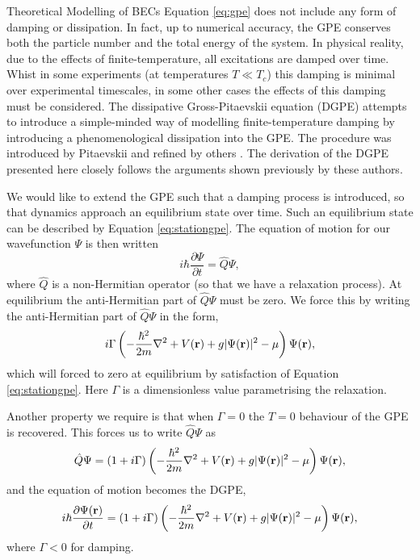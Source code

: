 \begin{chapter}{\label{cha:theoretical_model}Theoretical Modelling of BECs}
	Equation \ref{eq:gpe} does not include any form of damping or dissipation. In fact, up to numerical accuracy, the GPE conserves both the particle number and the total energy of the system. In physical reality, due to the effects of finite-temperature, all excitations are damped over time. Whist in some experiments (at temperatures $T\ll T_c$) this damping is minimal over experimental timescales, in some other cases the effects of this damping must be considered. The dissipative Gross-Pitaevskii equation (DGPE) attempts to introduce a simple-minded way of modelling finite-temperature damping by introducing a phenomenological dissipation into the GPE. The procedure was introduced by Pitaevskii \cite{lifshitzpitaevskii81} and refined by others \cite{choi_morgan_98,tsubota_kasamatsu_02,madarassy_barenghi_08}. The derivation of the DGPE presented here closely follows the arguments shown previously by these authors.

	We would like to extend the GPE such that a damping process is introduced, so that dynamics approach an equilibrium state over time. Such an equilibrium state can be described by Equation \ref{eq:stationgpe}. The equation of motion for our wavefunction $\Psi$ is then written 
		\begin{equation}\label{eq:disseqmotion}
		i\hbar \frac{\partial \Psi}{\partial t} = \hat{Q}\Psi,
		\end{equation}
	where $\hat{Q}$ is a non-Hermitian operator (so that we have a relaxation process). At equilibrium the anti-Hermitian part of $\hat{Q}\Psi$ must be zero. We force this by writing the anti-Hermitian part of $\hat{Q}\Psi$ in the form,
	\begin{equation*}\label{eq:dissantiherm}
		i\Gamma\left( -\frac{\hbar^2}{2m}\nabla^2 + V({\bf r}) + g|\Psi({\bf r})|^2 - \mu \right) \Psi({\bf r}),
	\end{equation*}
	which will forced to zero at equilibrium by satisfaction of Equation \ref{eq:stationgpe}. Here $\Gamma$ is a dimensionless value parametrising the relaxation.

	Another property we require is that when $\Gamma=0$ the $T=0$ behaviour of the GPE is recovered. This forces us to write $\hat{Q}\Psi$ as
	\begin{equation*}\label{eq:dissantiherm2}
		\hat{Q}\Psi = (1+i\Gamma)\left( -\frac{\hbar^2}{2m}\nabla^2 + V({\bf r}) + g|\Psi({\bf r})|^2 - \mu \right) \Psi({\bf r}),
	\end{equation*}
	and the equation of motion becomes the DGPE,
	\begin{equation}\label{eq:dissgpeA}
		i\hbar \frac{\partial \Psi({\bf r})}{\partial t} = (1+i\Gamma)\left( -\frac{\hbar^2 }{2m}\nabla^2 + V({\bf r}) + g|\Psi({\bf r})|^2- \mu \right) \Psi({\bf r}),
	\end{equation}
	where $\Gamma<0$ for damping.


\end{chapter}
